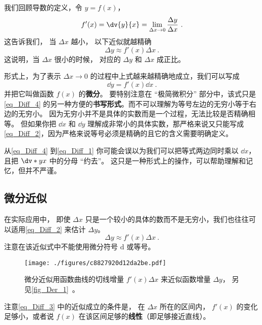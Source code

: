 
我们回顾导数的定义，令 $y = f(x)$，
\begin{equation}\label{eq_Diff_4}
f'(x) = \dv{y}{x} = \lim_{\Delta x\to 0} \frac{\Delta y}{\Delta x}~.
\end{equation}
这告诉我们， 当 $\Delta x$ 越小， 以下近似就越精确
\begin{equation}\label{eq_Diff_2}
\Delta y \approx f'(x) \Delta x~.
\end{equation}
这说明，当 $\Delta x$ 很小的时候， 对应的 $\Delta y$ 和 $\Delta x$ 成正比。

形式上，为了表示 $\Delta x\to 0$ 的过程中上式越来越精确地成立，我们可以写成
\begin{equation}\label{eq_Diff_1}
\dd{y} = f'(x)\dd{x}~.
\end{equation}
并把它叫做函数 $f(x)$ 的\textbf{微分}。 要特别注意在 “极简微积分” 部分中，该式只是\autoref{eq_Diff_4} 的另一种方便的\textbf{书写形式}。而不可以理解为等号左边的无穷小等于右边的无穷小。 因为无穷小并不是具体的实数而是一个过程，无法比较是否精确相等。 但如果你把 $\dd{x}$ 和 $\dd{y}$ 理解成非常小的具体实数，那严格来说又只能写成\autoref{eq_Diff_2}，因为严格来说等号必须是精确的且它的含义需要明确定义。

从\autoref{eq_Diff_4} 到\autoref{eq_Diff_1} 你可能会误以为我们可以把等式两边同时乘以 $\dd{x}$，且把 $\dv*{y}{x}$ 中的分母 “约去”。 这只是一种形式上的操作，可以帮助理解和记忆，但并不严谨。

\subsection{微分近似}\label{sub_Diff_1}

在实际应用中， 即使 $\Delta x$ 只是一个较小的具体的数而不是无穷小，我们也往往可以适用\autoref{eq_Diff_2} 来估计 $\Delta y$。
\begin{equation}\label{eq_Diff_3}
\Delta y \approx f'(x) \Delta x~.
\end{equation}
注意在该近似式中不能使用微分符号 $\mathrm{d}$ 或等号。

\begin{figure}[ht]
\centering
\texttt{[image: ./figures/c8827920d12da2be.pdf]}
\caption{微分近似用函数曲线的切线增量 $f'(x)\Delta x$ 来近似函数增量 $\Delta y$， 另见\autoref{fig_Der_1}~。} \label{fig_Diff_1}
\end{figure}
注意\autoref{eq_Diff_3} 中的近似成立的条件是， 在 $\Delta x$ 所在的区间内， $f'(x)$ 的变化足够小，或者说 $f(x)$ 在该区间足够的\textbf{线性}（即足够接近直线）。

